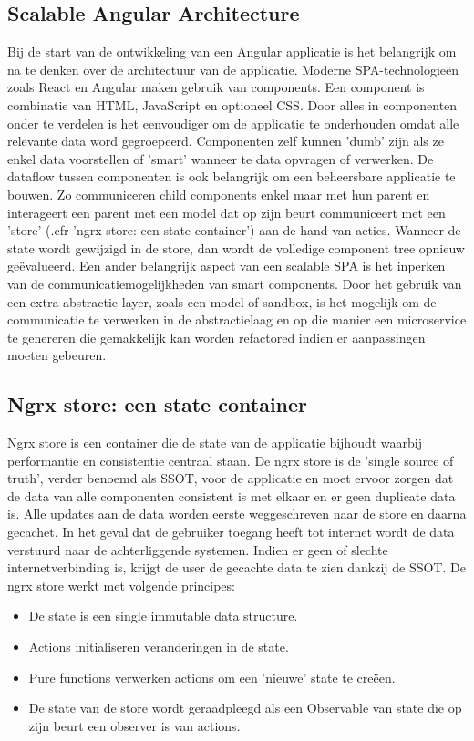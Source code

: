 \subsection{Scalable Angular Architecture}
Bij de start van de ontwikkeling van een Angular applicatie is het belangrijk om na te denken over de architectuur van de applicatie. Moderne SPA-technologie\"en zoals React en Angular maken gebruik van components. Een component is combinatie van HTML, JavaScript en optioneel CSS. Door alles in componenten onder te verdelen is het eenvoudiger om de applicatie te onderhouden omdat alle relevante data word gegroepeerd. Componenten zelf kunnen 'dumb' zijn als ze enkel data voorstellen of 'smart' wanneer te data opvragen of verwerken.
De dataflow tussen componenten is ook belangrijk om een beheersbare applicatie te bouwen. Zo communiceren child components enkel maar met hun parent en interageert een parent met een model dat op zijn beurt communiceert met een 'store' (.cfr 'ngrx store: een state container') aan de hand van acties. Wanneer de state wordt gewijzigd in de store, dan wordt de volledige component tree opnieuw ge\"evalueerd. Een ander belangrijk aspect van een scalable SPA is het inperken van de communicatiemogelijkheden van smart components. Door het gebruik van een extra abstractie layer, zoals een model of sandbox, is het mogelijk om de communicatie te verwerken in de abstractielaag en op die manier een microservice te genereren die gemakkelijk kan worden refactored indien er aanpassingen moeten gebeuren.
\subsection{Ngrx store: een state container}
Ngrx store is een container die de state van de applicatie bijhoudt waarbij performantie en consistentie centraal staan. De ngrx store is de 'single source of truth', verder benoemd als SSOT, voor de applicatie en moet ervoor zorgen dat de data van alle componenten consistent is met elkaar en er geen duplicate data is. Alle updates aan de data worden eerste weggeschreven naar de store en daarna gecachet. In het geval dat de gebruiker toegang heeft tot internet wordt de data verstuurd naar de achterliggende systemen. Indien er geen of slechte internetverbinding is, krijgt de user de gecachte data te zien dankzij de SSOT. De ngrx store werkt met volgende principes:
\begin{itemize}  
\item De state is een single immutable data structure.
\item Actions initialiseren veranderingen in de state.
\item Pure functions verwerken actions om een 'nieuwe' state te cre\"een.
\item De state van de store wordt geraadpleegd als een Observable van state die op zijn beurt een observer is van actions.
\end{itemize}
